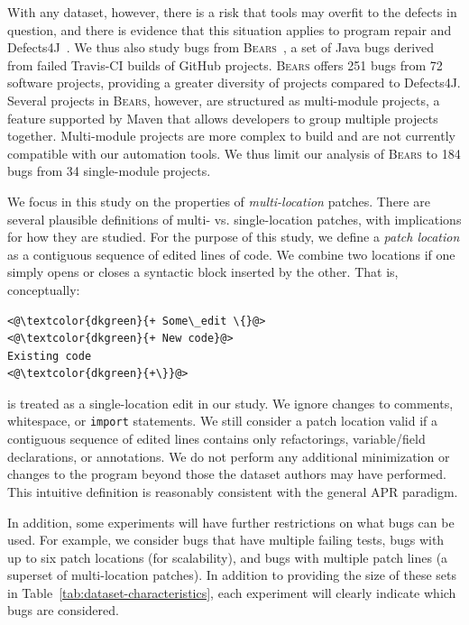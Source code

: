 \documentclass[10pt, conference]{IEEEtran}
\newcommand\bears{\textsc{Bears}\xspace}
\begin{document}
With any dataset, however, there is a risk that tools may overfit
to the defects in question, and there is evidence that this situation applies to
program repair and Defects4J~\cite{durieux-repair-them-all}. 
We thus also study bugs from \bears~\cite{bears}, 
a set of Java bugs derived from failed Travis-CI builds of GitHub projects. 
\bears offers 251 bugs from 72 software projects, providing a greater diversity of 
projects compared to Defects4J. 
Several projects in \bears, however, are structured as multi-module projects, a feature 
supported by Maven that allows developers to group multiple projects together. Multi-module 
projects are more complex to build and are not currently compatible with our automation tools.
We thus limit our analysis of \bears to 184 bugs from 34 single-module projects.

We focus in this study on the properties of \emph{multi-location} patches. There are
several plausible definitions of multi- vs. single-location patches, with
implications for how they are studied. For the purpose of this study, we define
a \emph{patch location} as a contiguous sequence of edited lines of code.  We
combine two locations if one simply opens or closes a syntactic block inserted
by the other. That is, conceptually:
\begin{lstlisting}[style=examplestyle]
<@\textcolor{dkgreen}{+ Some\_edit \{}@>
<@\textcolor{dkgreen}{+ New code}@>
Existing code
<@\textcolor{dkgreen}{+\}}@>
\end{lstlisting}
is treated as a single-location edit in our study. We ignore changes to
comments, whitespace, or \texttt{import} statements.
We still consider a patch location valid if a contiguous sequence of edited lines contains 
only refactorings, variable/field declarations, or annotations. We do not perform any 
additional minimization or changes to the program beyond those the dataset authors may 
have performed.
This intuitive definition is reasonably consistent with the general APR
paradigm. 

In addition, some experiments will have further restrictions on what bugs can be
used. For example, we consider bugs that have multiple failing tests, bugs with up to six patch 
locations (for scalability), and bugs with multiple patch lines (a superset of multi-location 
patches). In addition to providing the size of these sets in 
Table~\ref{tab:dataset-characteristics}, each experiment will clearly indicate
which bugs are considered. 
\end{document}
